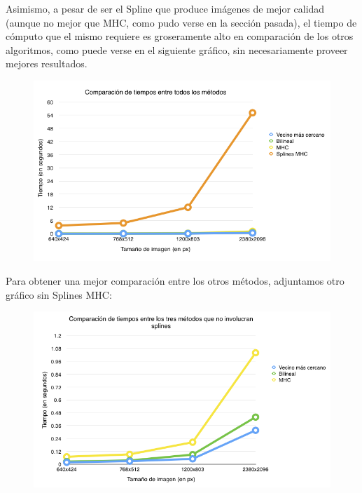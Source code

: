 \documentclass[a4paper]{article}
\begin{document}
Asimismo, a pesar de ser el Spline que produce imágenes de mejor calidad (aunque no mejor que MHC, como pudo verse en la sección pasada), el tiempo de cómputo que el mismo requiere es groseramente alto en comparación de los otros algoritmos, como puede verse en el siguiente gráfico, sin necesariamente proveer mejores resultados.

\begin{figure}[h!]
    \begin{center}
    \includegraphics[scale=0.65]{imagenes/tiempos/todosg.png}
    \label{tiempos1}
  \end{center}
\end{figure}

\newpage

Para obtener una mejor comparación entre los otros métodos, adjuntamos otro gráfico sin Splines MHC:

\begin{figure}[h!]
    \begin{center}
    \includegraphics[scale=0.65]{imagenes/tiempos/sinspline.png}
    \label{tiempos2}
  \end{center}
\end{figure}
\end{document}
